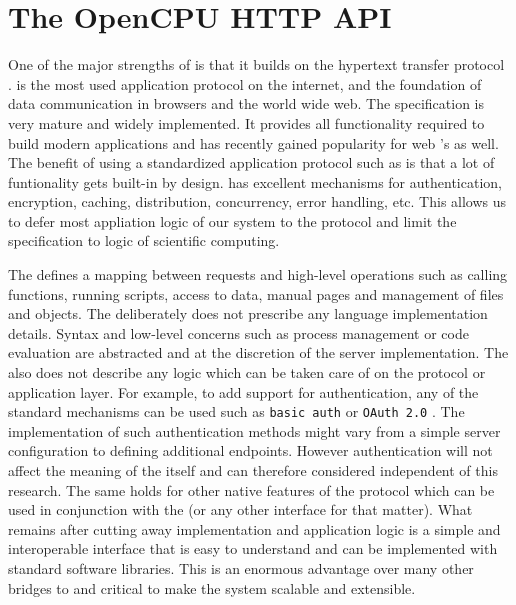 \section{The OpenCPU HTTP API}

One of the major strengths of \OpenCPU is that it builds on the hypertext transfer protocol \citep{rfc2616}. \HTTP is the most used application protocol on the internet, and the foundation of data communication in browsers and the world wide web. The \HTTP specification is very mature and widely implemented. It provides all functionality required to build modern applications and has recently gained popularity for web \API's as well. The benefit of using a standardized application protocol such as \HTTP is that a lot of funtionality gets built-in by design. \HTTP has excellent mechanisms for authentication, encryption, caching, distribution, concurrency, error handling, etc. This allows us to defer most appliation logic of our system to the protocol and limit the \API specification to logic of scientific computing. 

The \OpenCPU \API defines a mapping between \HTTP requests and high-level operations such as calling functions, running scripts, access to data, manual pages and management of files and objects. The \API deliberately does not prescribe any language implementation details. Syntax and low-level concerns such as process management or code evaluation are abstracted and at the discretion of the server implementation. The \API also does not describe any logic which can be taken care of on the protocol or application layer. For example, to add support for authentication, any of the standard mechanisms can be used such as \texttt{basic auth} \citep{franks1999rfc} or \texttt{OAuth 2.0} \citep{hardt2012oauth}. The implementation of such authentication methods might vary from a simple server configuration to defining additional endpoints. However authentication will not affect the meaning of the \API itself and can therefore considered independent of this research. The same holds for other native features of the \HTTP protocol which can be used in conjunction with the \OpenCPU \API (or any other \HTTP interface for that matter). What remains after cutting away implementation and application logic is a simple and interoperable interface that is easy to understand and can be implemented with standard \HTTP software libraries. This is an enormous advantage over many other bridges to \R and critical to make the system scalable and extensible. 

